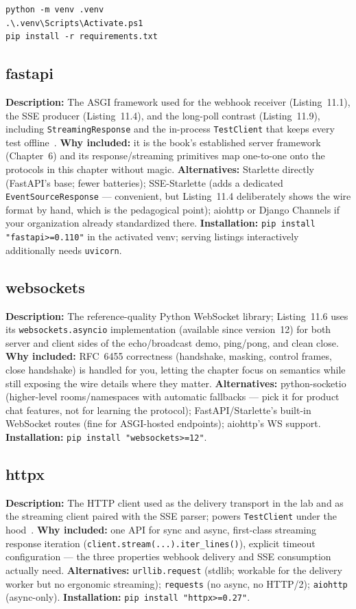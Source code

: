 \begin{verbatim}
python -m venv .venv
.\.venv\Scripts\Activate.ps1
pip install -r requirements.txt
\end{verbatim}

\subsection{fastapi}
\textbf{Description:} The ASGI framework used for the webhook receiver
(Listing~11.1), the SSE producer (Listing~11.4), and the long-poll contrast
(Listing~11.9), including \texttt{StreamingResponse} and the in-process
\texttt{TestClient} that keeps every test offline~\cite{fastapidocs}.
\textbf{Why included:} it is the book's established server framework
(Chapter~6) and its response/streaming primitives map one-to-one onto the
protocols in this chapter without magic.
\textbf{Alternatives:} Starlette directly (FastAPI's base; fewer batteries);
SSE-Starlette (adds a dedicated \texttt{EventSourceResponse} --- convenient,
but Listing~11.4 deliberately shows the wire format by hand, which is the
pedagogical point); aiohttp or Django Channels if your organization already
standardized there.
\textbf{Installation:} \texttt{pip install "fastapi>=0.110"} in the activated
venv; serving listings interactively additionally needs \texttt{uvicorn}.

\subsection{websockets}
\textbf{Description:} The reference-quality Python WebSocket library;
Listing~11.6 uses its \texttt{websockets.asyncio} implementation (available
since version~12) for both server and client sides of the echo/broadcast
demo, ping/pong, and clean close.
\textbf{Why included:} RFC~6455 correctness (handshake, masking, control
frames, close handshake) is handled for you, letting the chapter focus on
semantics while still exposing the wire details where they matter.
\textbf{Alternatives:} python-socketio (higher-level rooms/namespaces with
automatic fallbacks --- pick it for product chat features, not for learning
the protocol); FastAPI/Starlette's built-in WebSocket routes (fine for
ASGI-hosted endpoints); aiohttp's WS support.
\textbf{Installation:} \texttt{pip install "websockets>=12"}.

\subsection{httpx}
\textbf{Description:} The HTTP client used as the delivery transport in the
lab and as the streaming client paired with the SSE parser; powers
\texttt{TestClient} under the hood~\cite{httpxdocs}.
\textbf{Why included:} one API for sync and async, first-class streaming
response iteration (\texttt{client.stream(...).iter\_lines()}), explicit
timeout configuration --- the three properties webhook delivery and SSE
consumption actually need.
\textbf{Alternatives:} \texttt{urllib.request} (stdlib; workable for the
delivery worker but no ergonomic streaming); \texttt{requests} (no async, no
HTTP/2); \texttt{aiohttp} (async-only).
\textbf{Installation:} \texttt{pip install "httpx>=0.27"}.

